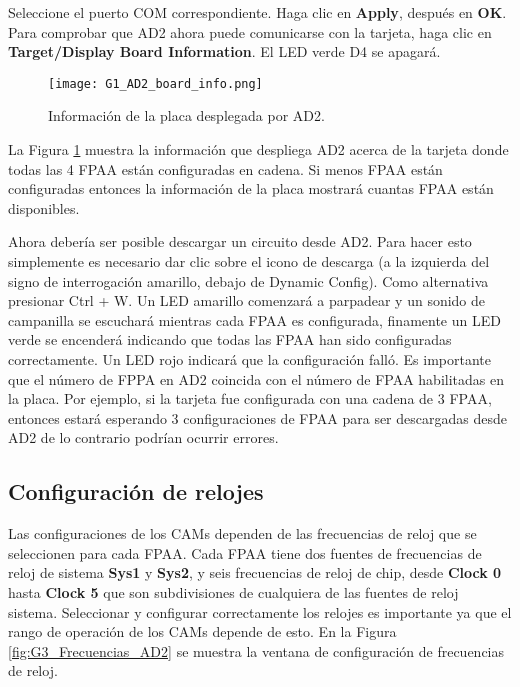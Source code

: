 	Seleccione el puerto COM correspondiente. Haga clic en \textbf{Apply}, después en \textbf{OK}. Para comprobar que AD2 ahora puede comunicarse con la tarjeta, haga clic en \textbf{Target/Display Board Information}. El LED verde D4 se apagará.

	\begin{figure}[hbtp]
		\caption{Información de la placa desplegada por AD2.}
		\label{fig:G1_AD2_board_info}
		\centering
		\texttt{[image: G1\_AD2\_board\_info.png]}
	\end{figure}
	
	La Figura \ref{fig:G1_AD2_board_info} muestra la información que despliega AD2 acerca de la tarjeta donde todas las 4 FPAA están configuradas en cadena. Si menos FPAA están configuradas entonces la información de la placa mostrará cuantas FPAA están disponibles.

	Ahora debería ser posible descargar un circuito desde AD2. Para hacer esto simplemente es necesario dar clic sobre el icono de descarga (a la izquierda del signo de interrogación amarillo, debajo de Dynamic Config). Como alternativa presionar Ctrl + W. Un LED amarillo comenzará a parpadear y un sonido de campanilla se escuchará mientras cada FPAA es configurada, finamente un LED verde se encenderá indicando que todas las FPAA han sido configuradas correctamente. Un LED rojo indicará que la configuración falló. Es importante que el número de FPPA en AD2 coincida con el número de FPAA habilitadas en la placa. Por ejemplo, si la tarjeta fue configurada con una cadena de 3 FPAA, entonces estará esperando 3 configuraciones de FPAA para ser descargadas desde AD2 de lo contrario podrían ocurrir errores.
	
	
		\subsection{Configuración de relojes}
	
	Las configuraciones de los CAMs dependen de las frecuencias de reloj que se seleccionen para cada FPAA. Cada FPAA tiene dos fuentes de frecuencias de reloj de sistema \textbf{Sys1} y \textbf{Sys2}, y seis frecuencias de reloj de chip, desde \textbf{Clock 0} hasta \textbf{Clock 5} que son subdivisiones de cualquiera de las fuentes de reloj sistema. Seleccionar y configurar correctamente los relojes es importante ya que el rango de operación de los CAMs depende de esto.  En la Figura \ref{fig:G3_Frecuencias_AD2} se muestra la ventana de configuración de frecuencias de reloj.
	
